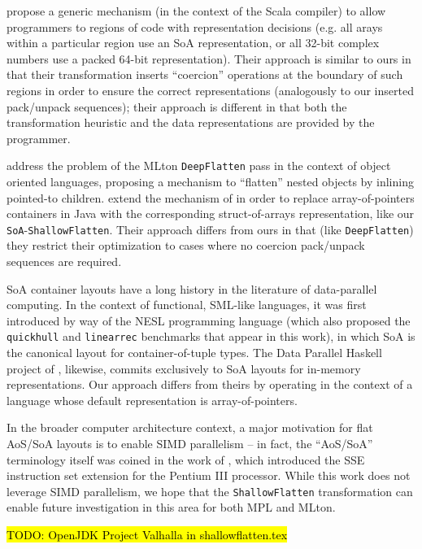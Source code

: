 \citet{automating-adhoc-paper} propose a generic mechanism (in the context of
the Scala compiler) to allow programmers to regions of code with representation
decisions (e.g. all arays within a particular region use an SoA representation,
or all 32-bit complex numbers use a packed 64-bit representation). Their
approach is similar to ours in that their transformation inserts ``coercion''
operations at the boundary of such regions in order to ensure the correct
representations (analogously to our inserted pack/unpack sequences); their
approach is different in that both the transformation heuristic and the data
representations are provided by the programmer.

\citet{object-inlining} address the problem of the MLton \texttt{DeepFlatten}
pass in the context of object oriented languages, proposing a mechanism to
``flatten'' nested objects by inlining pointed-to children. \citet{java-scicomp}
extend the mechanism of \citet{object-inlining} in order to replace
array-of-pointers containers in Java with the corresponding struct-of-arrays
representation, like our \texttt{SoA}-\texttt{ShallowFlatten}. Their approach
differs from ours in that (like \texttt{DeepFlatten}) they restrict their
optimization to cases where no coercion pack/unpack sequences are required.

SoA container layouts have a long history in the literature of data-parallel
computing. In the context of functional, SML-like languages, it was first
introduced by way of the NESL programming language \citep{nesl-book} (which
also proposed the \texttt{quickhull} and \texttt{linearrec} benchmarks that
appear in this work), in which SoA is the canonical layout for
container-of-tuple types. The Data Parallel Haskell project of
\citet{data-parallel-haskell}, likewise, commits exclusively to SoA layouts for
in-memory representations. Our approach differs from theirs by operating in the
context of a language whose default representation is array-of-pointers.

In the broader computer architecture context, a major motivation for flat
AoS/SoA layouts is to enable SIMD parallelism -- in fact, the ``AoS/SoA''
terminology itself was coined in the work of \citet{intel-simd-journal}, which introduced
the SSE instruction set extension for the Pentium III processor. While this work
does not leverage SIMD parallelism, we hope that the \texttt{ShallowFlatten}
transformation can enable future investigation in this area for both MPL and
MLton.



\hl{TODO: OpenJDK Project Valhalla in shallowflatten.tex}
